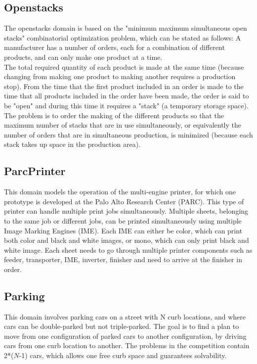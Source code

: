 \subsection{Openstacks}
The openstacks domain is based on the "minimum maximum simultaneous open stacks" combinatorial optimization problem, which can be stated as follows: A manufacturer has a number of orders, each for a combination of different products, and can only make one product at a time.\\

The total required quantity of each product is made at the same time (because changing from making one product to making another requires a production stop). From the time that the first product included in an order is made to the time that all products included in the order have been made, the order is said to be "open" and during this time it requires a "stack" (a temporary storage space). The problem is to order the making of the different products so that the maximum number of stacks that are in use simultaneously, or equivalently the number of orders that are in simultaneous production, is minimized (because each stack takes up space in the production area).

\subsection{ParcPrinter}
This domain models the operation of the multi-engine printer, for which one prototype is developed at the Palo Alto Research Center (PARC). This type of printer can handle multiple print jobs simultaneously. Multiple sheets, belonging to the same job or different jobs, can be printed simultaneously using multiple Image Marking Engines (IME). Each IME can either be color, which can print both color and black and white images, or mono, which can only print black and white image. Each sheet needs to go through multiple printer components such as feeder, transporter, IME, inverter, finisher and need to arrive at the finisher in order. 

\subsection{Parking}
This domain involves parking cars on a street with N curb locations, and where cars can be double-parked but not triple-parked. The goal is to find a plan to move from one configuration of parked cars to another configuration, by driving cars from one curb location to another. The problems in the competition contain 2*($N$-1) cars, which allows one free curb space and guarantees solvability.


